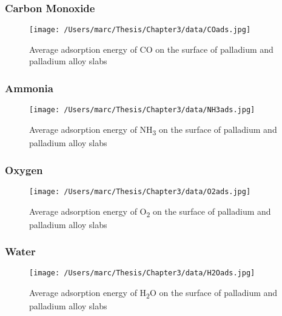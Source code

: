 \subsubsection{Carbon Monoxide}

\begin{landscape}
    \begin{figure}
        \centering
        \texttt{[image: /Users/marc/Thesis/Chapter3/data/COads.jpg]}
        \caption{Average adsorption energy of CO on the surface of palladium and palladium alloy slabs}
        \label{coads}
      \end{figure}
    
    \end{landscape}
\subsubsection{Ammonia}
\begin{landscape}
  \begin{figure}
      \centering
      \texttt{[image: /Users/marc/Thesis/Chapter3/data/NH3ads.jpg]}
      \caption{Average adsorption energy of NH\textsubscript{3} on the surface of palladium and palladium alloy slabs}
      \label{nh3ads}
    \end{figure}
  
  \end{landscape}
\subsubsection{Oxygen}

\begin{landscape}
  \begin{figure}
      \centering
      \texttt{[image: /Users/marc/Thesis/Chapter3/data/O2ads.jpg]}
      \caption{Average adsorption energy of O\textsubscript{2} on the surface of palladium and palladium alloy slabs}
      \label{O2ads}
    \end{figure}
  
  \end{landscape}

\subsubsection{Water}

\begin{landscape}
  \begin{figure}
      \centering
      \texttt{[image: /Users/marc/Thesis/Chapter3/data/H2Oads.jpg]}
      \caption{Average adsorption energy of H\textsubscript{2}O on the surface of palladium and palladium alloy slabs}
      \label{H2Oads}
    \end{figure}
  
  \end{landscape}
